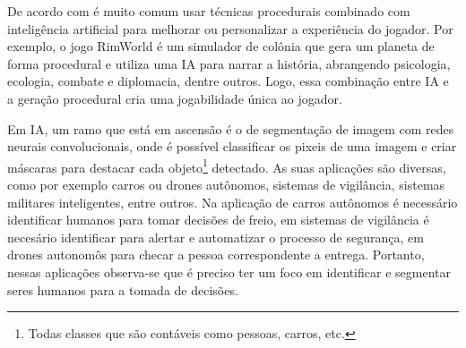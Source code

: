 


De acordo com  é muito comum usar técnicas procedurais combinado com inteligência artificial para melhorar ou personalizar a experiência do jogador. Por exemplo, o jogo RimWorld é um simulador de colônia que gera um planeta de forma procedural e utiliza uma IA para narrar a história, abrangendo psicologia, ecologia, combate e diplomacia, dentre outros. Logo, essa combinação entre IA e a geração procedural cria uma jogabilidade única ao jogador.


Em IA, um ramo que está em ascensão é o de segmentação de imagem com redes neurais convolucionais, onde é possível classificar os pixeis de uma imagem e criar máscaras  para destacar cada objeto\footnote{Todas classes que são contáveis como pessoas, carros, etc.} detectado. As suas aplicações são diversas, como por exemplo carros ou drones autônomos, sistemas de vigilância, sistemas militares inteligentes, entre outros. 
Na aplicação de carros autônomos é necessário identificar humanos para tomar decisões de freio, em sistemas de vigilância é necesário identificar para alertar e automatizar o processo de segurança, em drones autonomôs para checar a pessoa correspondente a entrega. Portanto, nessas aplicações observa-se que é preciso ter um foco em identificar e segmentar seres humanos para a tomada de decisões.

